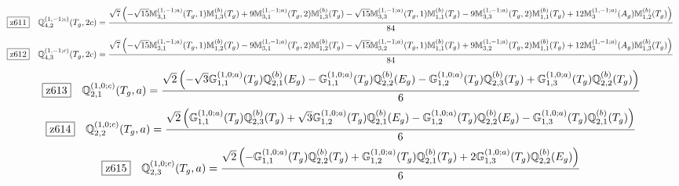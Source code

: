 \documentclass[fleqn,10pt,landscape]{jsarticle}
\begin{document}
\begin{dmath*}
\hspace*{3mm}\fbox{z611}\quad \mathbb{Q}_{4,2}^{(1,-1;c)}(T_{g},2c)=\frac{\sqrt{7} \left(- \sqrt{15} \mathbb{M}_{3,1}^{(1,-1;a)}(T_{g},1) \mathbb{M}_{1,3}^{(b)}(T_{g}) + 9 \mathbb{M}_{3,1}^{(1,-1;a)}(T_{g},2) \mathbb{M}_{1,3}^{(b)}(T_{g}) - \sqrt{15} \mathbb{M}_{3,3}^{(1,-1;a)}(T_{g},1) \mathbb{M}_{1,1}^{(b)}(T_{g}) - 9 \mathbb{M}_{3,3}^{(1,-1;a)}(T_{g},2) \mathbb{M}_{1,1}^{(b)}(T_{g}) + 12 \mathbb{M}_{3}^{(1,-1;a)}(A_{g}) \mathbb{M}_{1,2}^{(b)}(T_{g})\right)}{84}
\end{dmath*}
\begin{dmath*}
\hspace*{3mm}\fbox{z612}\quad \mathbb{Q}_{4,3}^{(1,-1;c)}(T_{g},2c)=\frac{\sqrt{7} \left(- \sqrt{15} \mathbb{M}_{3,1}^{(1,-1;a)}(T_{g},1) \mathbb{M}_{1,2}^{(b)}(T_{g}) - 9 \mathbb{M}_{3,1}^{(1,-1;a)}(T_{g},2) \mathbb{M}_{1,2}^{(b)}(T_{g}) - \sqrt{15} \mathbb{M}_{3,2}^{(1,-1;a)}(T_{g},1) \mathbb{M}_{1,1}^{(b)}(T_{g}) + 9 \mathbb{M}_{3,2}^{(1,-1;a)}(T_{g},2) \mathbb{M}_{1,1}^{(b)}(T_{g}) + 12 \mathbb{M}_{3}^{(1,-1;a)}(A_{g}) \mathbb{M}_{1,3}^{(b)}(T_{g})\right)}{84}
\end{dmath*}
\begin{dmath*}
\hspace*{3mm}\fbox{z613}\quad \mathbb{Q}_{2,1}^{(1,0;c)}(T_{g},a)=\frac{\sqrt{2} \left(- \sqrt{3} \mathbb{G}_{1,1}^{(1,0;a)}(T_{g}) \mathbb{Q}_{2,1}^{(b)}(E_{g}) - \mathbb{G}_{1,1}^{(1,0;a)}(T_{g}) \mathbb{Q}_{2,2}^{(b)}(E_{g}) - \mathbb{G}_{1,2}^{(1,0;a)}(T_{g}) \mathbb{Q}_{2,3}^{(b)}(T_{g}) + \mathbb{G}_{1,3}^{(1,0;a)}(T_{g}) \mathbb{Q}_{2,2}^{(b)}(T_{g})\right)}{6}
\end{dmath*}
\begin{dmath*}
\hspace*{3mm}\fbox{z614}\quad \mathbb{Q}_{2,2}^{(1,0;c)}(T_{g},a)=\frac{\sqrt{2} \left(\mathbb{G}_{1,1}^{(1,0;a)}(T_{g}) \mathbb{Q}_{2,3}^{(b)}(T_{g}) + \sqrt{3} \mathbb{G}_{1,2}^{(1,0;a)}(T_{g}) \mathbb{Q}_{2,1}^{(b)}(E_{g}) - \mathbb{G}_{1,2}^{(1,0;a)}(T_{g}) \mathbb{Q}_{2,2}^{(b)}(E_{g}) - \mathbb{G}_{1,3}^{(1,0;a)}(T_{g}) \mathbb{Q}_{2,1}^{(b)}(T_{g})\right)}{6}
\end{dmath*}
\begin{dmath*}
\hspace*{3mm}\fbox{z615}\quad \mathbb{Q}_{2,3}^{(1,0;c)}(T_{g},a)=\frac{\sqrt{2} \left(- \mathbb{G}_{1,1}^{(1,0;a)}(T_{g}) \mathbb{Q}_{2,2}^{(b)}(T_{g}) + \mathbb{G}_{1,2}^{(1,0;a)}(T_{g}) \mathbb{Q}_{2,1}^{(b)}(T_{g}) + 2 \mathbb{G}_{1,3}^{(1,0;a)}(T_{g}) \mathbb{Q}_{2,2}^{(b)}(E_{g})\right)}{6}
\end{dmath*}
\end{document}
